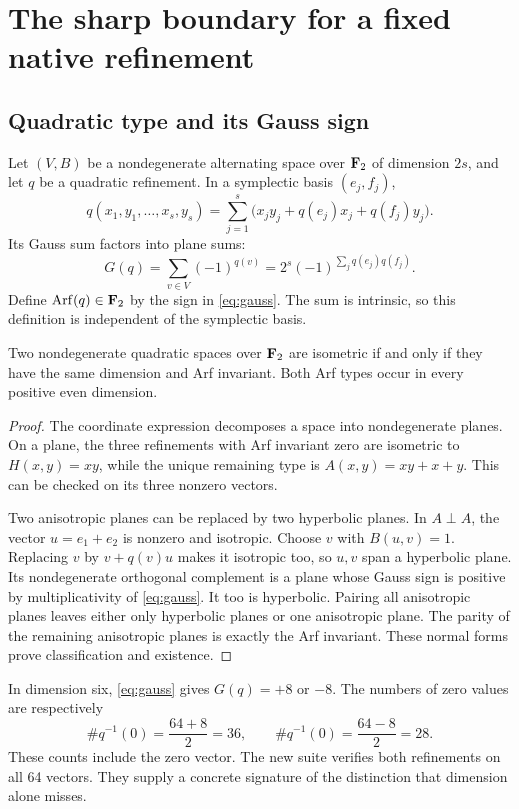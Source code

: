 \section{The sharp boundary for a fixed native refinement}\label{sec:capacity}
\subsection{Quadratic type and its Gauss sign}
Let $(V,B)$ be a nondegenerate alternating space over $\mathbf F_2$ of dimension $2s$, and let $q$ be a quadratic refinement. In a symplectic basis $(e_j,f_j)$,
\[
 q(x_1,y_1,\ldots,x_s,y_s)
 =\sum_{j=1}^s\bigl(x_jy_j+q(e_j)x_j+q(f_j)y_j\bigr).
\]
Its Gauss sum factors into plane sums:
\[
 G(q)=\sum_{v\in V}(-1)^{q(v)}
 =2^s(-1)^{\sum_j q(e_j)q(f_j)}.
 \tag{27.1}\label{eq:gauss}
\]
Define $\operatorname{Arf}(q)\in\mathbf F_2$ by the sign in \eqref{eq:gauss}. The sum is intrinsic, so this definition is independent of the symplectic basis.

\begin{lemma}\label{lem:arfclass}
Two nondegenerate quadratic spaces over $\mathbf F_2$ are isometric if and only if they have the same dimension and Arf invariant. Both Arf types occur in every positive even dimension.
\end{lemma}
\begin{proof}
The coordinate expression decomposes a space into nondegenerate planes. On a plane, the three refinements with Arf invariant zero are isometric to $H(x,y)=xy$, while the unique remaining type is $A(x,y)=xy+x+y$. This can be checked on its three nonzero vectors.

Two anisotropic planes can be replaced by two hyperbolic planes. In $A\perp A$, the vector $u=e_1+e_2$ is nonzero and isotropic. Choose $v$ with $B(u,v)=1$. Replacing $v$ by $v+q(v)u$ makes it isotropic too, so $u,v$ span a hyperbolic plane. Its nondegenerate orthogonal complement is a plane whose Gauss sign is positive by multiplicativity of \eqref{eq:gauss}. It too is hyperbolic. Pairing all anisotropic planes leaves either only hyperbolic planes or one anisotropic plane. The parity of the remaining anisotropic planes is exactly the Arf invariant. These normal forms prove classification and existence.
\end{proof}

In dimension six, \eqref{eq:gauss} gives $G(q)=+8$ or $-8$. The numbers of zero values are respectively
\[
 \#q^{-1}(0)=\frac{64+8}{2}=36,
 \qquad \#q^{-1}(0)=\frac{64-8}{2}=28.
 \tag{27.2}\label{eq:rank8zeros}
\]
These counts include the zero vector. The new suite verifies both refinements on all 64 vectors. They supply a concrete signature of the distinction that dimension alone misses.

